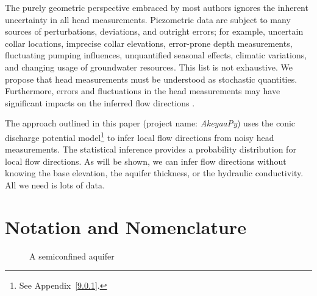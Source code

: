 \documentclass[12pt]{report}
\begin{document}
The purely geometric perspective embraced by most authors ignores the inherent uncertainty in all head measurements. Piezometric data are subject to many sources of perturbations, deviations, and outright errors; for example, uncertain collar locations, imprecise collar elevations, error-prone depth measurements, fluctuating pumping influences, unquantified seasonal effects, climatic variations, and changing usage of groundwater resources. This list is not exhaustive. We propose that head measurements must be understood as stochastic quantities. Furthermore, errors and fluctuations in the head measurements may have significant impacts on the inferred flow directions \citep[e.g.][]{Devlin2007}.

The approach outlined in this paper (project name: {\em AkeyaaPy}) uses the conic discharge potential model\footnote{See Appendix~\ref{9.0.1}.} to infer local flow directions from noisy head measurements. The statistical inference provides a probability distribution for local flow directions. As will be shown, we can infer flow directions without knowing the base elevation, the aquifer thickness, or the hydraulic conductivity. All we need is lots of data.


\section{Notation and Nomenclature}



\begin{figure}[p]
\begin{center}
    \caption{A semiconfined aquifer}
    \label{1.1.1}
\end{center}
\end{figure}
\end{document}
